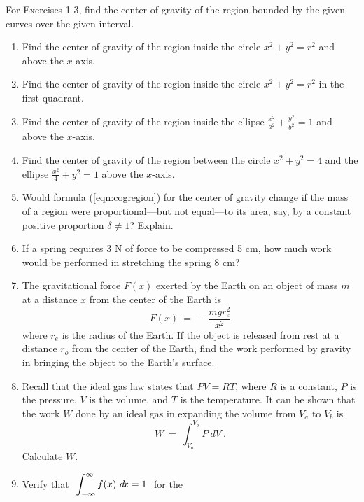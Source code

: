 \startexercises\label{sec8dot5}
{\small
{}
\par\noindent For Exercises 1-3, find the center of gravity of the region
bounded by the given curves over the given interval.
\begin{enumerate}[\bfseries 1.]
 \item Find the center of gravity of the region inside the circle $x^2+y^2=r^2$
  and above the $x$-axis.
 \item Find the center of gravity of the region inside the circle $x^2+y^2=r^2$
  in the first quadrant.
 \item Find the center of gravity of the region inside the ellipse
  $\frac{x^2}{a^2}+\frac{y^2}{b^2}=1$ and above the $x$-axis.
 \item Find the center of gravity of the region between the circle $x^2+y^2=4$
  and the ellipse $\frac{x^2}{4}+y^2=1$ above the $x$-axis.
 \item Would formula (\ref{eqn:cogregion}) for the center of gravity change if
  the mass of a region were proportional---but not equal---to its area,
  say, by a constant positive proportion $\delta \ne 1$? Explain.
 \item If a spring requires 3 N of force to be compressed 5 cm, how much work
  would be performed in stretching the spring 8 cm?
 \item The gravitational force $F(x)$ exerted by the Earth on an object of mass
  $m$ at a distance $x$ from the center of the Earth is
\[
F(x) ~=~ -\frac{mgr_e^2}{x^2}
\]
where $r_e$ is the radius of the Earth. If the object is released from rest at a
distance $r_o$ from the center of the Earth, find the work performed by gravity
in bringing the object to the Earth's surface.
 \item Recall that the ideal gas law states that $PV=RT$, where $R$ is a
  constant, $P$ is the pressure, $V$ is the volume, and $T$ is the temperature.
  It can be shown that the work $W$ done by an ideal gas in expanding the volume
  from $V_a$ to $V_b$ is
\[
W ~=~ \int_{V_a}^{V_b} P~d\!V ~.
\]
Calculate $W$.
 \item Verify that $~\displaystyle\int_{-\infty}^{\infty} f(x)~d\!x = 1~$ for the

\end{enumerate}}
